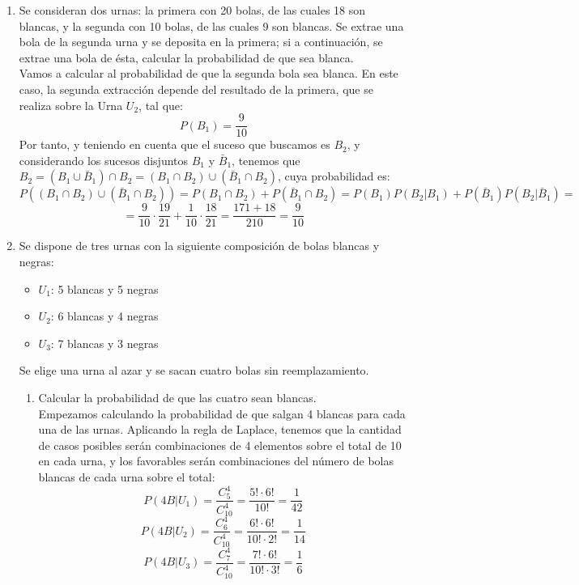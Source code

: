 \documentclass[a4paper,12pt]{article}
\begin{document}
\begin{enumerate}[label=\textbf{\arabic*.}]
    
    \item Se consideran dos urnas: la primera con 20 bolas, de las cuales 18 son blancas, y la segunda con 10 bolas, de las cuales 9 son blancas. Se extrae una bola de la segunda urna y se deposita en la primera; si a continuación, se extrae una bola de ésta, calcular la probabilidad de que sea blanca.\\

    Vamos a calcular al probabilidad de que la segunda bola sea blanca. En este caso, la segunda extracción depende del resultado de la primera, que se realiza sobre la Urna $U_2$, tal que:
    $$P(B_1)=\frac{9}{10}$$
    Por tanto, y teniendo en cuenta que el suceso que buscamos es $B_2$, y considerando los sucesos disjuntos $B_1$ y $\bar B_1$, tenemos que  $B_2= (B_1 \cup \bar B_1)\cap B_2=(B_1\cap B_2) \cup (\bar B_1\cap B_2)$, cuya probabilidad es:
    $$P((B_1\cap B_2) \cup (\bar B_1\cap B_2))= P(B_1\cap B_2) + P(\bar B_1\cap B_2)= P(B_1)P(B_2|B_1)+P(\bar B_1)P(B_2|\bar B_1)=$$
    $$= \frac{9}{10} \cdot \frac{19}{21}+\frac{1}{10} \cdot \frac{18}{21}=\frac{171+18}{210}=\frac{9}{10}$$
    
    
    \item Se dispone de tres urnas con la siguiente composición de bolas blancas y negras:
    
    \begin{itemize}
        \item \( U_1 \): 5 blancas y 5 negras
        \item \( U_2 \): 6 blancas y 4 negras
        \item \( U_3 \): 7 blancas y 3 negras
    \end{itemize}
    
    Se elige una urna al azar y se sacan cuatro bolas sin reemplazamiento.
    
    \begin{enumerate}
        \item Calcular la probabilidad de que las cuatro sean blancas.\\

        Empezamos calculando la probabilidad de que salgan 4 blancas para cada una de las urnas. Aplicando la regla de Laplace, tenemos que la cantidad de casos posibles serán combinaciones de 4 elementos sobre el total de 10 en cada urna, y los favorables serán combinaciones del número de bolas blancas de cada urna sobre el total:
        $$P(4B|U_1)=\frac{C^4_5}{C^4_{10}}=\frac{5!\cdot6!}{10!}= \frac{1}{42}$$
        $$P(4B|U_2)=\frac{C^4_6}{C^4_{10}}=\frac{6!\cdot6!}{10!\cdot2!}= \frac{1}{14}$$
        $$P(4B|U_3)=\frac{C^4_7}{C^4_{10}}=\frac{7!\cdot6!}{10!\cdot3!}= \frac{1}{6}$$
        

\end{enumerate}
\end{enumerate}
\end{document}
